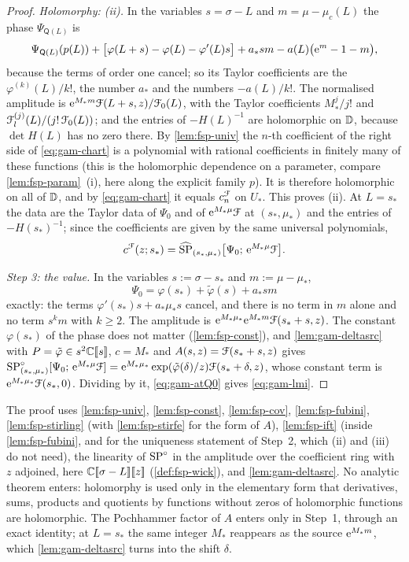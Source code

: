 \begin{proof}
\emph{Holomorphy: (ii).} In the variables $s=\sigma-L$ and $m=\mu-\mu_c(L)$ the phase $\Psi_{\mathsf Q(L)}$ is
\[
\Psi_{\mathsf Q(L)}(p(L))+\bigl[\varphi(L+s)-\varphi(L)-\varphi'(L)s\bigr]+a_*sm-a(L)\bigl(\mathrm{e}^{m}-1-m\bigr),
\]
because the terms of order one cancel; so its Taylor coefficients are the $\varphi^{(k)}(L)/k!$, the number $a_*$ and the numbers $-a(L)/k!$. The normalised amplitude is $\mathrm{e}^{M_*m}\mathcal{F}(L+s,z)/\mathcal{F}_0(L)$, with the Taylor coefficients $M_*^j/j!$ and $\mathcal{F}_l^{(j)}(L)/(j!\,\mathcal{F}_0(L))$; and the entries of $-H(L)^{-1}$ are holomorphic on $\mathbb{D}$, because $\det H(L)$ has no zero there. By \cref{lem:fsp-univ} the $n$-th coefficient of the right side of \eqref{eq:gam-chart} is a polynomial with rational coefficients in finitely many of these functions (this is the holomorphic dependence on a parameter, compare \cref{lem:fsp-param}~(i), here along the explicit family $p$). It is therefore holomorphic on all of $\mathbb{D}$, and by \eqref{eq:gam-chart} it equals $c^{\mathcal{F}}_n$ on $U_*$. This proves (ii). At $L=s_*$ the data are the Taylor data of $\Psi_0$ and of $\mathrm{e}^{M_*\mu}\mathcal{F}$ at $(s_*,\mu_*)$ and the entries of $-H(s_*)^{-1}$; since the coefficients are given by the same universal polynomials,
\begin{equation}
\label{eq:gam-atQ0}
c^{\mathcal{F}}(z;s_*)=\widehat{\mathrm{SP}}_{(s_*,\mu_*)}\bigl[\Psi_0;\,\mathrm{e}^{M_*\mu}\mathcal{F}\bigr].
\end{equation}

\emph{Step 3: the value.} In the variables $s:=\sigma-s_*$ and $m:=\mu-\mu_*$,
\[
\Psi_0=\varphi(s_*)+\tilde\varphi(s)+a_*sm
\]
exactly: the terms $\varphi'(s_*)s+a_*\mu_*s$ cancel, and there is no term in $m$ alone and no term $s^km$ with $k\geq 2$. The amplitude is $\mathrm{e}^{M_*\mu_*}\mathrm{e}^{M_*m}\mathcal{F}(s_*+s,z)$. The constant $\varphi(s_*)$ of the phase does not matter (\cref{lem:fsp-const}), and \cref{lem:gam-deltasrc} with $P=\tilde\varphi\in s^2\mathbb{C}[\![ s ]\!]$, $c=M_*$ and $A(s,z)=\mathcal{F}(s_*+s,z)$ gives $\mathrm{SP}^{\circ}_{(s_*,\mu_*)}[\Psi_0;\,\mathrm{e}^{M_*\mu}\mathcal{F}]=\mathrm{e}^{M_*\mu_*}\exp(\tilde\varphi(\delta)/z)\mathcal{F}(s_*+\delta,z)$, whose constant term is $\mathrm{e}^{M_*\mu_*}\mathcal{F}(s_*,0)$. Dividing by it, \eqref{eq:gam-atQ0} gives \eqref{eq:gam-lmi}.
\end{proof}

The proof uses \cref{lem:fsp-univ}, \cref{lem:fsp-const}, \cref{lem:fsp-cov}, \cref{lem:fsp-fubini}, \cref{lem:fsp-stirling} (with \cref{lem:fsp-stirfe} for the form of $A$), \cref{lem:fsp-ift} (inside \cref{lem:fsp-fubini}, and for the uniqueness statement of Step~2, which (ii) and (iii) do not need), the linearity of $\mathrm{SP}^{\circ}$ in the amplitude over the coefficient ring with $z$ adjoined, here $\mathbb{C}[\![ \sigma-L ]\!][\![ z ]\!]$ (\cref{def:fsp-wick}), and \cref{lem:gam-deltasrc}. No analytic theorem enters: holomorphy is used only in the elementary form that derivatives, sums, products and quotients by functions without zeros of holomorphic functions are holomorphic. The Pochhammer factor of $A$ enters only in Step~1, through an exact identity; at $L=s_*$ the same integer $M_*$ reappears as the source $\mathrm{e}^{M_*m}$, which \cref{lem:gam-deltasrc} turns into the shift $\delta$.

